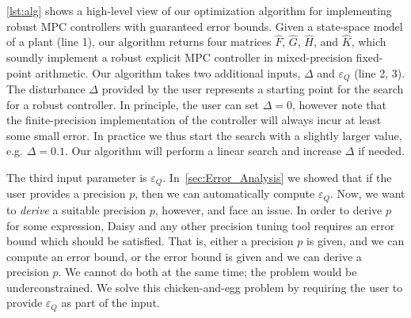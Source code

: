 \autoref{lst:alg} shows a high-level view of our optimization algorithm for
implementing robust MPC controllers with guaranteed error bounds.
Given a state-space model of a plant (line 1), our algorithm returns four matrices
$\hat{F}$, $\hat{G}$, $\hat{H}$, and $\hat{K}$,
which soundly implement a robust explicit MPC controller in mixed-precision
fixed-point arithmetic.
Our algorithm takes two additional inputs, $\Delta$ and $\varepsilon_Q$ (line 2, 3). 
The disturbance $\Delta$ provided by the user represents a starting point for 
the search for a robust controller. In principle, the user can set $\Delta = 0$,
however note that the finite-precision implementation of the controller will always
incur at least some small error. In practice we thus start the search with a slightly
larger value, e.g. $\Delta = 0.1$. Our algorithm will perform a linear search and
increase $\Delta$ if needed.

The third input parameter is $\varepsilon_Q$. In~\autoref{sec:Error_Analysis} we
showed that if the user provides a precision $p$, then we can automatically
compute $\varepsilon_Q$.
Now, we want to \emph{derive} a suitable precision $p$, however, and face an
issue. In order to derive $p$ for some expression, Daisy and any other precision
tuning tool requires an error bound which should be satisfied. That is, either a
precision $p$ is given, and we can compute an error bound, or the error bound is
given and we can derive a precision $p$. We cannot do both at the same time; the
problem would be underconstrained. We solve this chicken-and-egg problem by
requiring the user to provide $\varepsilon_Q$ as part of the input.

